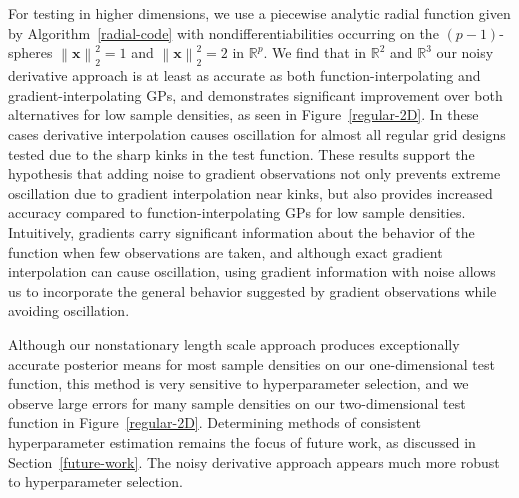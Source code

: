 \documentclass{article}
\newcommand{\norm}[1]{\left\lVert#1\right\rVert}
\renewcommand{\vec}[1]{\mathbf{#1}}
\newcommand{\R}{\mathbb{R}}
\begin{document}
For testing in higher dimensions, we use a piecewise analytic radial function given by Algorithm~\ref{radial-code} with nondifferentiabilities occurring on the $(p-1)$-spheres $\norm{\vec{x}}_2^2 = 1$ and $\norm{\vec{x}}_2^2 = 2$ in $\R^p$. We find that in $\R^2$ and $\R^3$ our noisy derivative approach is at least as accurate as both function-interpolating and gradient-interpolating GPs, and demonstrates significant improvement over both alternatives for low sample densities, as seen in Figure~\ref{regular-2D}. In these cases derivative interpolation causes oscillation for almost all regular grid designs tested due to the sharp kinks in the test function. These results support the hypothesis that adding noise to gradient observations not only prevents extreme oscillation due to gradient interpolation near kinks, but also provides increased accuracy compared to function-interpolating GPs for low sample densities. Intuitively, gradients carry significant information about the behavior of the function when few observations are taken, and although exact gradient interpolation can cause oscillation, using gradient information with noise allows us to incorporate the general behavior suggested by gradient observations while avoiding oscillation.

Although our nonstationary length scale approach produces exceptionally accurate posterior means for most sample densities on our one-dimensional test function, this method is very sensitive to hyperparameter selection, and we observe large errors for many sample densities on our two-dimensional test function in Figure~\ref{regular-2D}. Determining methods of consistent hyperparameter estimation remains the focus of future work, as discussed in Section~\ref{future-work}. The noisy derivative approach appears much more robust to hyperparameter selection.
\end{document}
